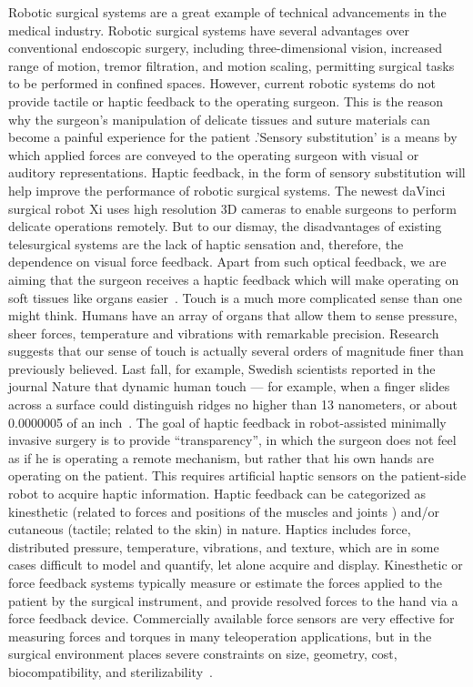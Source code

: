 \documentclass[10pt,journal,compsoc]{IEEEtran}
\begin{document}
Robotic surgical systems are a great example of technical advancements in the medical industry.  Robotic surgical systems have several advantages over conventional endoscopic surgery, including three-dimensional vision, increased range of motion, tremor filtration, and motion scaling, permitting surgical tasks to be performed in confined spaces.
However, current robotic systems do not provide tactile or haptic feedback to the operating surgeon. This is the reason why the surgeon's manipulation of delicate tissues and suture materials can become a painful experience for the patient .'Sensory substitution' is a means by which applied forces are conveyed to the operating surgeon with visual or auditory representations. Haptic feedback, in the form of sensory substitution will help improve the performance of robotic surgical systems.  
The newest daVinci surgical robot Xi uses high resolution 3D cameras to enable surgeons to perform delicate operations remotely.  But to our dismay, the disadvantages of existing telesurgical systems are the lack of haptic sensation and, therefore, the dependence on visual force feedback.  Apart from such optical feedback, we are aiming that the surgeon receives a haptic feedback which will make operating on soft tissues like organs easier~\cite{bethea2004}.
Touch is a much more complicated sense than one might think. Humans have an array of organs that allow them to sense pressure, sheer forces, temperature and vibrations with remarkable precision. Research suggests that our sense of touch is actually several orders of magnitude finer than previously believed. Last fall, for example, Swedish scientists reported in the journal Nature that dynamic human touch --- for example, when a finger slides across a surface could distinguish ridges no higher than 13 nanometers, or about 0.0000005 of an inch~\cite{humantouch}.
The goal of haptic feedback  in robot-assisted minimally invasive surgery is to provide \enquote{transparency}, in which the surgeon does not feel as if he is operating a remote mechanism, but rather that his own hands are operating on the patient. This requires artificial haptic sensors on the patient-side robot to acquire haptic information. Haptic feedback can be categorized as kinesthetic (related to forces and positions of the muscles and joints ) and/or cutaneous (tactile; related to the skin) in nature. Haptics includes force, distributed pressure, temperature, vibrations, and texture, which are in some cases difficult to model and quantify, let alone acquire and display. 
Kinesthetic or force feedback systems typically measure or estimate the forces applied to the patient by the surgical instrument, and provide resolved forces to the hand via a force feedback device. Commercially available force sensors are very effective for measuring forces and torques in many teleoperation applications, but in the surgical environment places severe constraints on size, geometry, cost, biocompatibility, and sterilizability~\cite{okamuracou2009}.
\end{document}
